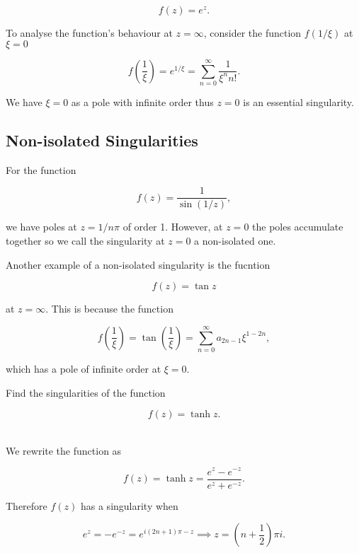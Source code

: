 \documentclass[english,a4paper,12pt]{report}
\begin{document}
\begin{equation}
    f(z) = e^z.
\end{equation}

To analyse the function's behaviour at \(z = \infty\), consider the function \(f(1/\xi )\) at \(\xi =0\)

\begin{equation}
    f\left( \frac{1}{\xi }  \right) = e^{1/\xi } = \sum_{n=0}^{\infty} \frac{1}{\xi ^{n} n! }.  
\end{equation}

We have \(\xi =0\) as a pole with infinite order thus \(z = 0\) is an essential singularity.

\subsection{Non-isolated Singularities}

For the function 

\begin{equation}
    f(z) = \frac{1}{\sin (1 /z)}, 
\end{equation}

we have poles at \(z = 1/n \pi \) of order 1. However, at \(z = 0\) the poles accumulate together so we call the singularity at \(z = 0\) a non-isolated one.

Another example of a non-isolated singularity is the fucntion 

\begin{equation}
    f(z) = \tan z 
\end{equation}

at \(z = \infty\). This is because the function 

\begin{equation}
    f\left( \frac{1}{\xi }  \right) = \tan \left( \frac{1}{\xi }  \right) = \sum_{n=0}^{\infty} a_{2n-1} \xi ^{1-2n},  
\end{equation}

which has a pole of infinite order at \(\xi = 0\). 

{Find the singularities of the function

\begin{equation}
    f(z) = \tanh z.
\end{equation}
~
}
{We rewrite the function as 

\begin{equation}
    f(z) = \tanh z = \frac{e^{z}-e^{-z}  }{e^{z}+e^{-z}  }. 
\end{equation}

Therefore \(f(z)\) has a singularity when

\begin{equation}
    e^{z} = - e^{-z} = e^{i(2n+1)\pi -z} \implies z = \left( n+\frac{1}{2}  \right) \pi i.   
\end{equation}



} 
\end{document}
